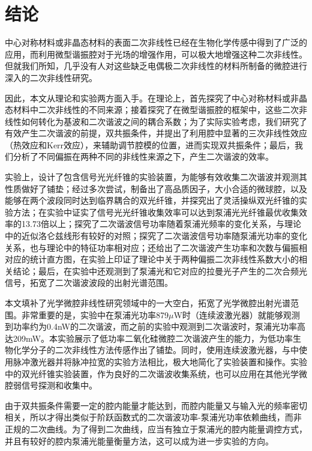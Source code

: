 \chapter{结论}
\label{sec:conclu}

中心对称材料或非晶态材料的表面二次非线性已经在生物化学传感中得到了广泛的应用，而利用微型谐振腔对于光场的增强作用，可以极大地增强这种二次非线性。但就我们所知，几乎没有人对这些缺乏电偶极二次非线性的材料所制备的微腔进行深入的二次非线性研究。

因此，本文从理论和实验两方面入手。在理论上，首先探究了中心对称材料或非晶态材料中二次非线性的不同来源；接着探究了在微型谐振腔的框架中，这些二次非线性如何转化为基波和二次谐波之间的耦合系数；为了实际实验考虑，我们研究了有效产生二次谐波的前提，双共振条件，并提出了利用腔中显著的三次非线性效应（热效应和Kerr效应），来辅助调节腔模的位置，进而实现双共振条件；最后，我们分析了不同偏振在两种不同的非线性来源之下，产生二次谐波的效率。

实验上，设计了包含信号光光纤锥的实验装置，为能够有效收集二次谐波并观测其性质做好了铺垫；经过多次尝试，制备出了高品质因子，大小合适的微球腔，以及能够在两个波段同时达到临界耦合的双光纤锥，并探究出了灵活操纵双光纤锥的实验方法；在实验中证实了信号光光纤锥收集效率可以达到泵浦光光纤锥最优收集效率的13.73倍以上；探究了二次谐波信号功率随着泵浦光频率的变化关系，与理论中的近似洛仑兹线形有较好的对照；探究了二次谐波信号功率随泵浦光功率的变化关系，也与理论中的特征功率相对应；还给出了二次谐波产生功率和次数与偏振相对应的统计直方图，在实验上印证了理论中关于两种偏振二次非线性系数大小的相关结论；最后，在实验中还观测到了泵浦光和它对应的拉曼光子产生的二次合频光信号，拓宽了二次谐波波段的出射光谱范围。

本文填补了光学微腔非线性研究领域中的一大空白，拓宽了光学微腔出射光谱范围。非常重要的是，实验中在泵浦光功率879$\mu$W时（连续波激光器）就能够观测到功率约为0.4nW的二次谐波，而之前的实验中观测到二次谐波时，泵浦光功率高达209mW\cite{asano2016visible}。本实验展示了低功率二氧化硅微腔二次谐波产生的能力，为低功率生物化学分子的二次非线性方法传感作出了铺垫。同时，使用连续波激光器，与\cite{dominguez2011whispering}中使用脉冲激光器并将脉冲拉宽的实验方法相比，极大地简化了实验装置和操作。实验中的双光纤锥实验装置，作为良好的二次谐波收集系统，也可以应用在其他光学微腔弱信号探测和收集中。

由于双共振条件需要一定的腔内能量才能达到，而腔内能量又与输入光的频率密切相关，所以才得出类似于阶跃函数式的二次谐波功率-泵浦光功率依赖曲线，而非正规的二次曲线。为了得到二次曲线，应当有独立于泵浦光的腔内能量调控方式，并且有较好的腔内泵浦光能量衡量方法，这可以成为进一步实验的方向。